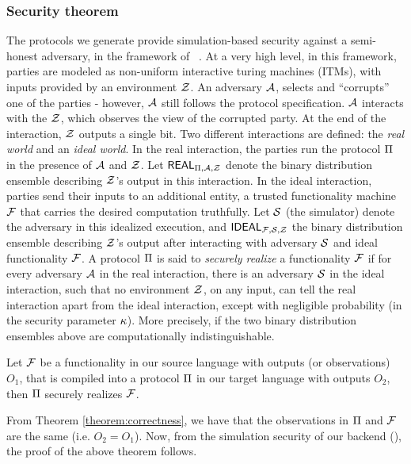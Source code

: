 \subsubsection*{Security theorem} The protocols we generate provide simulation-based security against a semi-honest adversary, in the framework of ~\cite{gmw,can00,can01}. At a very high level, in this framework, parties are modeled as non-uniform interactive turing machines (ITMs), with inputs provided by an environment $\mathcal{Z}$. An adversary $\mathcal{A}$, selects and ``corrupts'' one of the parties - however, $\mathcal{A}$ still follows the protocol specification. $\mathcal{A}$ interacts with the $\mathcal{Z}$, which observes the view of the corrupted party. At the end of the interaction, $\mathcal{Z}$ outputs a single bit. Two different interactions are defined: the {\em real world} and an {\em ideal world}. In the real interaction, the parties run the protocol $\Pi$ in the presence of $\mathcal{A}$ and $\mathcal{Z}$. Let $\mathsf{REAL}_{\Pi,\mathcal{A},\mathcal{Z}}$ denote the binary distribution ensemble describing $\mathcal{Z}$'s output in this interaction. In the ideal interaction, parties send their inputs to an additional entity, a trusted functionality machine $\mathcal{F}$ that carries the desired computation truthfully. Let $\mathcal{S}$ (the simulator) denote the adversary in this idealized execution, and $\mathsf{IDEAL}_{\mathcal{F},\mathcal{S},\mathcal{Z}}$ the binary distribution ensemble describing $\mathcal{Z}$'s output after interacting with adversary $\mathcal{S}$ and ideal functionality $\mathcal{F}$. A protocol $\Pi$ is said to {\em securely realize} a functionality $\mathcal{F}$ if for every adversary $\mathcal{A}$ in the real interaction, there is an adversary $\mathcal{S}$ in the ideal interaction, such that no environment $\mathcal{Z}$, on any input, can tell the real interaction apart from the ideal interaction, except with negligible probability (in the security parameter $\kappa$). More precisely, if the two binary distribution ensembles above are computationally indistinguishable.
\begin{theorem}[Security]\label{theorem:security}
Let $\mathcal{F}$ be a functionality in our source language with outputs (or observations) $O_1$, that is compiled into a protocol $\Pi$ in our target language with outputs $O_2$, then $\Pi$ securely realizes $\mathcal{F}$.  
\end{theorem}
 From Theorem \ref{theorem:correctness}, we have that the observations in $\Pi$ and $\mathcal{F}$ are the same (i.e. $O_2 = O_1$). Now, from the simulation security of our backend (\cite{aby}), the proof of the above theorem follows. 
